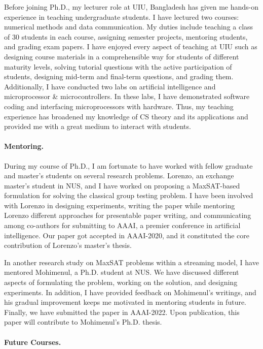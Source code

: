 \documentclass[11pt]{article}
\begin{document}
		
		Before joining Ph.D., my lecturer role at UIU, Bangladesh has given me hands-on experience in teaching undergraduate students. I have lectured two courses: numerical methods and data communication. My duties include teaching a class of 30 students in each course, assigning semester projects, mentoring students, and grading exam papers.  I have enjoyed every aspect of teaching at UIU such as designing course materials in a comprehensible way for students of different maturity levels, solving tutorial questions with the active participation of students, designing mid-term and final-term questions, and grading them. Additionally, I have conducted two labs on artificial intelligence and microprocessor \& microcontrollers. In these labs, I have demonstrated software coding and interfacing microprocessors with hardware. Thus, my teaching experience has broadened my knowledge of CS theory and its applications and provided me with a great medium to interact with students. 
		
		
	\paragraph{Mentoring.}
	
		During my course of Ph.D., I am fortunate to have worked with fellow graduate and master's students on several research problems. Lorenzo, an exchange master's student in NUS, and I have worked on proposing a MaxSAT-based formulation for solving the classical group testing problem. I have been involved with Lorenzo in designing experiments, writing the paper while mentoring Lorenzo different approaches for presentable paper writing, and communicating among co-authors for submitting to AAAI, a premier conference in artificial intelligence. Our paper got accepted in AAAI-2020, and it constituted the core contribution of Lorenzo's master's thesis.
		
		In another research study on MaxSAT problems within a streaming model, I have mentored Mohimenul, a Ph.D. student at NUS. We have discussed different aspects of formulating the problem, working on the solution, and designing experiments. In addition, I have provided feedback on Mohimenul's writings, and his gradual improvement keeps me motivated in mentoring students in future. Finally, we have submitted the paper in AAAI-2022. Upon publication, this paper will contribute to Mohimenul's Ph.D. thesis.

	
	\paragraph{Future Courses.}
	
\end{document}
